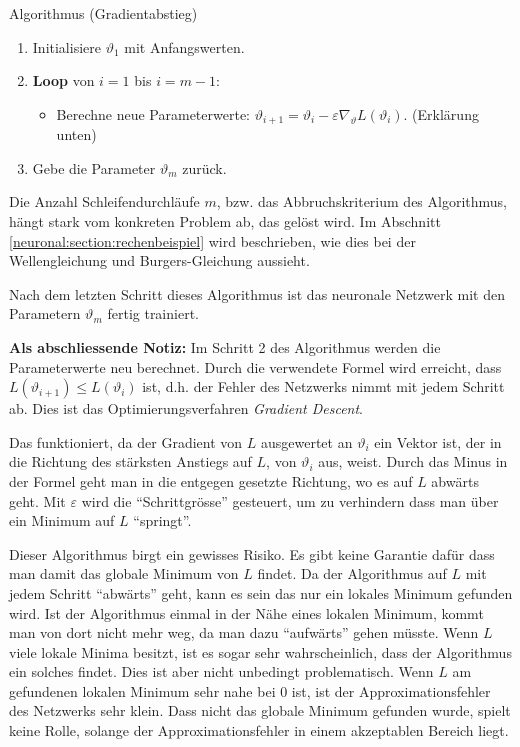 \begin{aufgabe}
    Algorithmus (Gradientabstieg)
    \begin{enumerate}
        \item Initialisiere \( \vartheta_1 \) mit Anfangswerten.
        \item \textbf{Loop} von \( i = 1 \) bis \( i = m - 1 \):
        \begin{itemize}
            \item Berechne neue Parameterwerte: \( \vartheta_{i+1} = \vartheta_i - \varepsilon \nabla_\vartheta L\left(\vartheta_i\right) \). (Erklärung unten)
        \end{itemize}
        \item Gebe die Parameter \( \vartheta_m \) zurück.
    \end{enumerate}
    \label{neuronal:gradient_descent}
\end{aufgabe}

Die Anzahl Schleifendurchläufe \( m \), bzw. das Abbruchskriterium des Algorithmus, hängt stark vom konkreten Problem ab, das gelöst wird.
Im Abschnitt \ref{neuronal:section:rechenbeispiel} wird beschrieben, wie dies bei der Wellengleichung und Burgers-Gleichung aussieht.

Nach dem letzten Schritt dieses Algorithmus ist das neuronale Netzwerk mit den Parametern \( \vartheta_m \) fertig trainiert.

\textbf{Als abschliessende Notiz:} Im Schritt 2 des Algorithmus werden die Parameterwerte neu berechnet.
Durch die verwendete Formel wird erreicht, dass \( L(\vartheta_{i+1}) \leq L(\vartheta_i) \) ist, d.h. der Fehler des Netzwerks nimmt mit jedem Schritt ab.
Dies ist das Optimierungsverfahren \emph{Gradient Descent}.

Das funktioniert, da der Gradient von \( L \) ausgewertet an \( \vartheta_i \) ein Vektor ist, der in die Richtung des stärksten Anstiegs auf \( L \), von \(\vartheta_i \) aus, weist.
Durch das Minus in der Formel geht man in die entgegen gesetzte Richtung, wo es auf \( L \) abwärts geht. 
Mit \( \varepsilon \) wird die ``Schrittgrösse'' gesteuert, um zu verhindern dass man über ein Minimum auf \( L \) ``springt''.

Dieser Algorithmus birgt ein gewisses Risiko. 
Es gibt keine Garantie dafür dass man damit das globale Minimum von \( L \) findet.
Da der Algorithmus auf \( L \) mit jedem Schritt ``abwärts'' geht, kann es sein das nur ein lokales Minimum gefunden wird.
Ist der Algorithmus einmal in der Nähe eines lokalen Minimum, kommt man von dort nicht mehr weg, da man dazu ``aufwärts'' gehen müsste.
Wenn \( L \) viele lokale Minima besitzt, ist es sogar sehr wahrscheinlich, dass der Algorithmus ein solches findet.
Dies ist aber nicht unbedingt problematisch.
Wenn \( L \) am gefundenen lokalen Minimum sehr nahe bei 0 ist, ist der Approximationsfehler des Netzwerks sehr klein.
Dass nicht das globale Minimum gefunden wurde, spielt keine Rolle, solange der Approximationsfehler in einem akzeptablen Bereich liegt.

